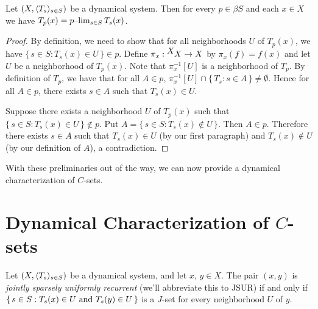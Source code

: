   \begin{prop}
    \label{prop:dsplim}
    Let $(X, \langle T_s \rangle_{s \in S})$ be a dynamical system.
    Then for every $p \in \beta S$ and each $x \in X$ we have $T_p(x)
    = \hbox{$p$--$\lim_{s \in S} T_s(x)$}$.
  \end{prop}
  \begin{proof}
    By definition, we need to show that for all neighborhoods $U$ of
    $T_p(x)$, we have $\{\, s \in S : T_s(x) \in U \,\} \in p$. 
    Define $\pi_x : \hbox{${}^{\hbox{$X$}}\hskip -1 pt X$} \to X$ by $\pi_x(f) = f(x)$ and let
    $U$ be a neighborhood of $T_p(x)$.
    Note that $\pi_x^{-1}[U]$ is a neighborhood of $T_p$.
    By definition of $T_p$, we have that for all $A \in p$,
    $\pi_x^{-1}[U] \cap \{\, T_s : s \in A \,\} \ne \emptyset$. 
    Hence for all $A \in p$, there exists $s \in A$ such that $T_s(x)
    \in U$. 

    Suppose there exists a neighborhood $U$ of $T_p(x)$ such that
    $\{\, s \in S : T_s(x) \in U \,\} \not\in p$. 
    Put $A = \{\, s \in S : T_s(x) \not\in U\,\}$.
    Then $A \in p$.
    Therefore there exists $s \in A$ such that $T_s(x) \in U$ (by our
    first paragraph) and $T_s(x) \not\in U$ (by our definition of
    $A$), a contradiction.
  \end{proof}

With these preliminaries out of the way, we can now provide a
dynamical characterization of $C$-sets.

\section{Dynamical Characterization of $C$-sets}
\label{sec:dyncsets}
 \begin{defn}
    \label{defn:JSUR}
    Let $(X, \langle T_s \rangle_{s \in S})$ be a dynamical system, and let $x$, $y \in X$. 
    The pair $(x,y)$ is \textsl{jointly sparsely uniformly recurrent}
    (we'll abbreviate this to JSUR) if and only if $\{\, s \in S :
    \hbox{$T_s(x) \in U$ and $T_s(y) \in U$} \,\}$ is a $J$-set for every
    neighborhood $U$ of $y$.%
  \end{defn}


